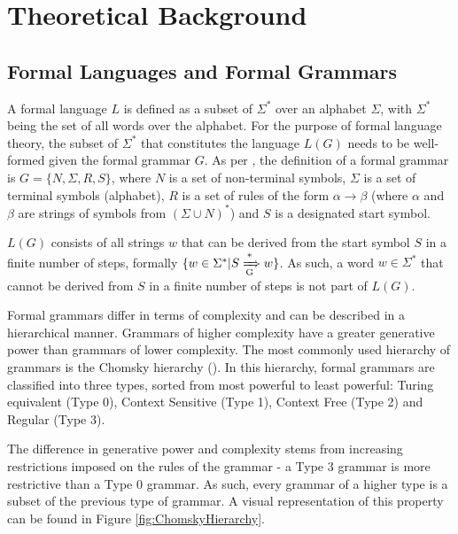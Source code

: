 \section{Theoretical Background}\label{theoreticalBackground}


\subsection{Formal Languages and Formal Grammars}\label{formalLanguages}
A formal language $L$ is defined as a subset of $\Sigma^{*}$ over an alphabet $\Sigma$, with $\Sigma^{*}$ being the set of all words over the alphabet. For the purpose of formal language theory, the subset of $\Sigma^{*}$ that constitutes the language $L(G)$ needs to be well-formed given the formal grammar $G$.
As per \cite{JurafskyMartin2009}, the definition of a formal grammar is $G = \lbrace N, \Sigma, R, S \rbrace$, where $N$ is a set of non-terminal symbols, $\Sigma$ is a set of terminal symbols (alphabet), $R$ is a set of rules of the form $\alpha \rightarrow \beta$ (where $\alpha$ and $\beta$ are strings of symbols from $(\Sigma \cup N)^{*}$) and $S$ is a designated start symbol.

$L(G)$ consists of all strings $w$ that can be derived from the start symbol $S$ in a finite number of steps, formally $\lbrace w \in \Sigma^{*} | S \xRightarrow [\text{G}]{\text{*}} w \rbrace$. As such, a word $w \in \Sigma^{*}$ that cannot be derived from $S$ in a finite number of steps is not part of $L(G)$.

Formal grammars differ in terms of complexity and can be described in a hierarchical manner. Grammars of higher complexity have a greater generative power than grammars of lower complexity. The most commonly used hierarchy of grammars is the Chomsky hierarchy (\cite{Chomsky1959}). In this hierarchy, formal grammars are classified into three types, sorted from most powerful to least powerful: Turing equivalent (Type 0), Context Sensitive (Type 1), Context Free (Type 2) and Regular (Type 3).

The difference in generative power and complexity stems from increasing restrictions imposed on the rules of the grammar - a Type 3 grammar is more restrictive than a Type 0 grammar. As such, every grammar of a higher type is a subset of the previous type of grammar. A visual representation of this property can be found in Figure \ref{fig:ChomskyHierarchy}.

